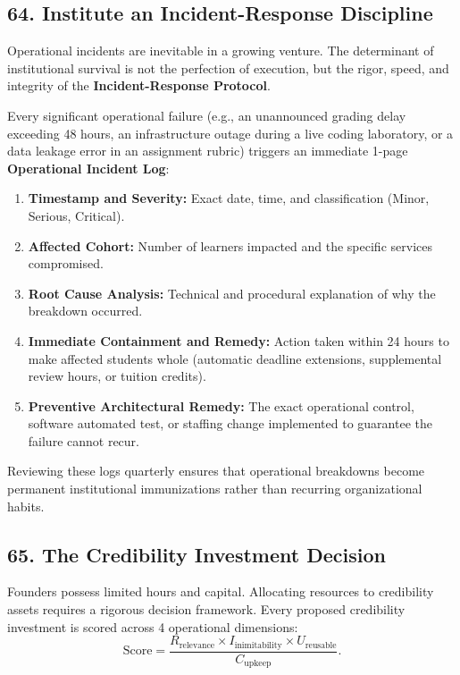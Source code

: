 \subsection*{64. Institute an Incident-Response Discipline}

Operational incidents are inevitable in a growing venture. The determinant of institutional survival is not the perfection of execution, but the rigor, speed, and integrity of the \textbf{Incident-Response Protocol}.

Every significant operational failure (e.g., an unannounced grading delay exceeding 48 hours, an infrastructure outage during a live coding laboratory, or a data leakage error in an assignment rubric) triggers an immediate 1-page \textbf{Operational Incident Log}:
\begin{enumerate}
\item \textbf{Timestamp and Severity:} Exact date, time, and classification (Minor, Serious, Critical).
\item \textbf{Affected Cohort:} Number of learners impacted and the specific services compromised.
\item \textbf{Root Cause Analysis:} Technical and procedural explanation of why the breakdown occurred.
\item \textbf{Immediate Containment and Remedy:} Action taken within 24 hours to make affected students whole (automatic deadline extensions, supplemental review hours, or tuition credits).
\item \textbf{Preventive Architectural Remedy:} The exact operational control, software automated test, or staffing change implemented to guarantee the failure cannot recur.
\end{enumerate}

Reviewing these logs quarterly ensures that operational breakdowns become permanent institutional immunizations rather than recurring organizational habits.

\subsection*{65. The Credibility Investment Decision}

Founders possess limited hours and capital. Allocating resources to credibility assets requires a rigorous decision framework. Every proposed credibility investment is scored across 4 operational dimensions:
\begin{equation}
\text{Score} = \frac{R_{\text{relevance}} \times I_{\text{inimitability}} \times U_{\text{reusable}}}{C_{\text{upkeep}}}.
\end{equation}

